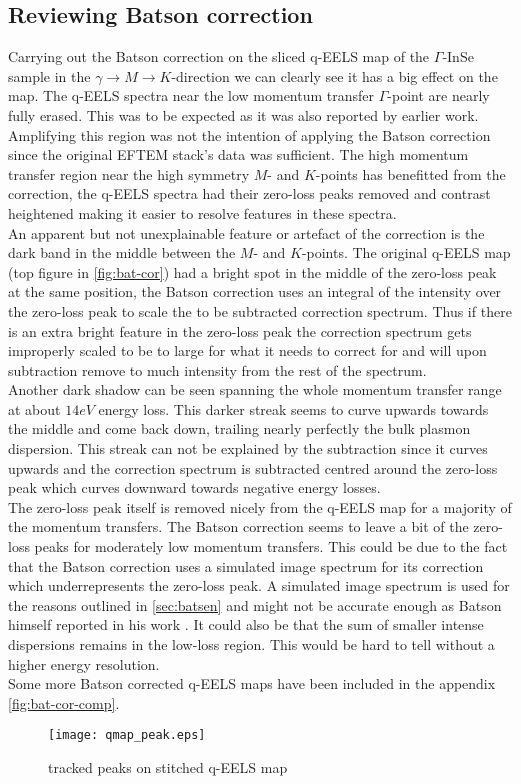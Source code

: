 \subsection{Reviewing Batson correction}
Carrying out the Batson correction on the sliced q-EELS map of the $\Gamma$-InSe sample in the $\gamma \rightarrow M \rightarrow K$-direction we can clearly see it has a big effect on the map. The q-EELS spectra near the low momentum transfer $\Gamma$-point are nearly fully erased. This was to be expected as it was also reported by earlier work.\cite{Schneider:191230} Amplifying this region was not the intention of applying the Batson correction since the original EFTEM stack's data was sufficient. The high momentum transfer region near the high symmetry $M$- and $K$-points has benefitted from the correction, the q-EELS spectra had their zero-loss peaks removed and contrast heightened making it easier to resolve features in these spectra.\\
An apparent but not unexplainable feature or artefact of the correction is the dark band in the middle between the $M$- and $K$-points. The original q-EELS map (top figure in \ref{fig:bat-cor}) had a bright spot in the middle of the zero-loss peak at the same position, the Batson correction uses an integral of the intensity over the zero-loss peak to scale the to be subtracted correction spectrum. Thus if there is an extra bright feature in the zero-loss peak the correction spectrum gets improperly scaled to be to large for what it needs to correct for and will upon subtraction remove to much intensity from the rest of the spectrum.\\
Another dark shadow can be seen spanning the whole momentum transfer range at about $14eV$ energy loss. This darker streak seems to curve upwards towards the middle and come back down, trailing nearly perfectly the bulk plasmon dispersion. This streak can not be explained by the subtraction since it curves upwards and the correction spectrum is subtracted centred around the zero-loss peak which curves downward towards negative energy losses.\\
The zero-loss peak itself is removed nicely from the q-EELS map for a majority of the momentum transfers. The Batson correction seems to leave a bit of the zero-loss peaks for moderately low momentum transfers. This could be due to the fact that the Batson correction uses a simulated image spectrum for its correction which underrepresents the zero-loss peak. A simulated image spectrum is used for the reasons outlined in \ref{sec:batsen} and might not be accurate enough as Batson himself reported in his work \cite{PhysRevB.27.5224}. It could also be that the sum of smaller intense dispersions remains in the low-loss region. This would be hard to tell without a higher energy resolution.\\
Some more Batson corrected q-EELS maps have been included in the appendix \ref{fig:bat-cor-comp}.
\newpage
%
\begin{figure}
	\centering
	\texttt{[image: qmap\_peak.eps]}
	\caption{tracked peaks on stitched q-EELS map}
	\label{fig:qmap-track}
\end{figure}
